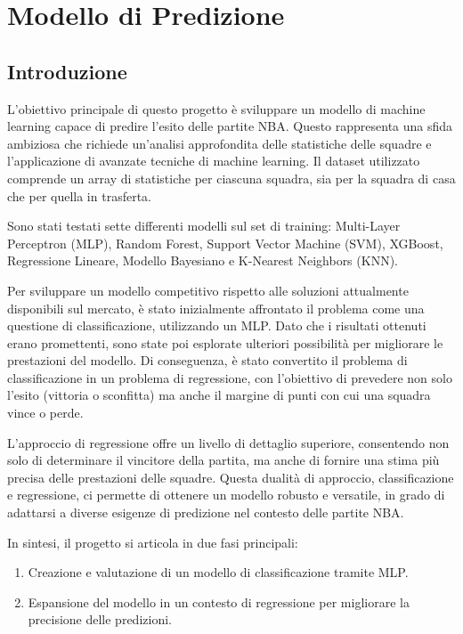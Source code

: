 \documentclass[a4paper]{article}
\numberwithin{equation}{section}
\begin{document}
\section{Modello di Predizione}
\subsection{Introduzione}
L'obiettivo principale di questo progetto è sviluppare un modello di machine learning capace di predire l'esito delle partite NBA. Questo rappresenta una sfida ambiziosa che richiede un'analisi approfondita delle statistiche delle squadre e l'applicazione di avanzate tecniche di machine learning. Il dataset utilizzato comprende un array di statistiche per ciascuna squadra, sia per la squadra di casa che per quella in trasferta.

Sono stati testati sette differenti modelli sul set di training: Multi-Layer Perceptron (MLP), Random Forest, Support Vector Machine (SVM), XGBoost, Regressione Lineare, Modello Bayesiano e K-Nearest Neighbors (KNN).

Per sviluppare un modello competitivo rispetto alle soluzioni attualmente disponibili sul mercato, è stato inizialmente affrontato il problema come una questione di classificazione, utilizzando un MLP. Dato che i risultati ottenuti erano promettenti, sono state poi esplorate ulteriori possibilità per migliorare le prestazioni del modello. Di conseguenza, è stato convertito il problema di classificazione in un problema di regressione, con l'obiettivo di prevedere non solo l'esito (vittoria o sconfitta) ma anche il margine di punti con cui una squadra vince o perde.

L'approccio di regressione offre un livello di dettaglio superiore, consentendo non solo di determinare il vincitore della partita, ma anche di fornire una stima più precisa delle prestazioni delle squadre. Questa dualità di approccio, classificazione e regressione, ci permette di ottenere un modello robusto e versatile, in grado di adattarsi a diverse esigenze di predizione nel contesto delle partite NBA.

In sintesi, il progetto si articola in due fasi principali:
\begin{enumerate}
    \item Creazione e valutazione di un modello di classificazione tramite MLP.
    \item Espansione del modello in un contesto di regressione per migliorare la precisione delle predizioni.
\end{enumerate}
\end{document}
